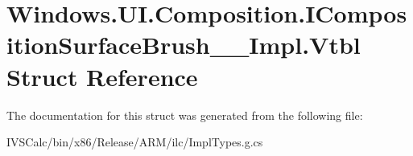 \hypertarget{struct_windows_1_1_u_i_1_1_composition_1_1_i_composition_surface_brush_____impl_1_1_vtbl}{}\section{Windows.\+U\+I.\+Composition.\+I\+Composition\+Surface\+Brush\+\_\+\+\_\+\+Impl.\+Vtbl Struct Reference}
\label{struct_windows_1_1_u_i_1_1_composition_1_1_i_composition_surface_brush_____impl_1_1_vtbl}


The documentation for this struct was generated from the following file\+:\begin{DoxyCompactItemize}
\item 
I\+V\+S\+Calc/bin/x86/\+Release/\+A\+R\+M/ilc/Impl\+Types.\+g.\+cs\end{DoxyCompactItemize}

